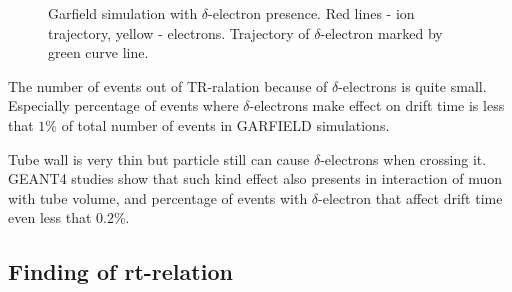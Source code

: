 \documentclass[]{article}
\begin{document}
	\begin{figure}[h!]
		\centering
		\qquad
		\caption{Garfield simulation with $\delta$-electron presence. Red lines - ion trajectory, yellow - electrons. Trajectory of $\delta$-electron marked by green curve line.}			
	\end{figure}	
	
	The number of events out of TR-ralation because of $\delta$-electrons is quite small. Especially percentage of events where $\delta$-electrons make effect on drift time is less that $1\%$ of total number of events  in GARFIELD simulations. 
	
	Tube wall is very thin but particle still can cause $\delta$-electrons when crossing it. GEANT4 studies show that such kind effect also presents in interaction of muon with tube volume, and percentage of events with $\delta$-electron that affect drift time even less that $0.2\%$.
	
	\subsection{Finding of rt-relation}
	
\end{document}
